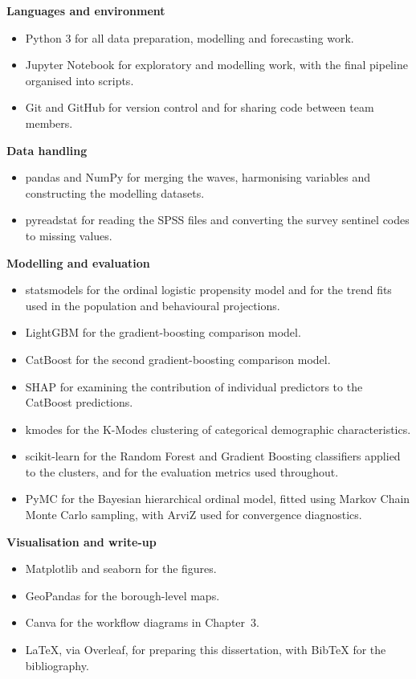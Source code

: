 \documentclass[ %
                    author={Ashrey Ashrey, Sanya Kapoor, Trisha Sharma, Yash Bhooshan Pandloskar},
                supervisor={Dr. Dalila O’Grady},
                    degree={MSc},
                     title={Using machine learning to forecast physical activity participation, volunteering and activity patterns in London},
                  subtitle={},
                      type={},
                      year={2021}]{dissertation}
\begin{document}
\noindent
\textbf{Languages and environment}
\begin{itemize}
  \item Python 3 for all data preparation, modelling and forecasting work.
  \item Jupyter Notebook for exploratory and modelling work, with the final
        pipeline organised into scripts.
  \item Git and GitHub for version control and for sharing code between team
        members.
\end{itemize}

\noindent
\textbf{Data handling}
\begin{itemize}
  \item pandas and NumPy for merging the waves, harmonising variables and
        constructing the modelling datasets.
  \item pyreadstat for reading the SPSS files and converting the survey sentinel
        codes to missing values.
\end{itemize}

\noindent
\textbf{Modelling and evaluation}
\begin{itemize}
  \item statsmodels for the ordinal logistic propensity model and for the trend
        fits used in the population and behavioural projections.
  \item LightGBM for the gradient-boosting comparison model.
  \item CatBoost for the second gradient-boosting comparison model.
  \item SHAP for examining the contribution of individual predictors to the
        CatBoost predictions.
  \item kmodes for the K-Modes clustering of categorical demographic
        characteristics.
  \item scikit-learn for the Random Forest and Gradient Boosting classifiers
        applied to the clusters, and for the evaluation metrics used throughout.
  \item PyMC for the Bayesian hierarchical ordinal model, fitted using Markov
        Chain Monte Carlo sampling, with ArviZ used for convergence diagnostics.
\end{itemize}

\noindent
\textbf{Visualisation and write-up}
\begin{itemize}
  \item Matplotlib and seaborn for the figures.
  \item GeoPandas for the borough-level maps.
  \item Canva for the workflow diagrams in Chapter~3.
  \item LaTeX, via Overleaf, for preparing this dissertation, with BibTeX for
        the bibliography.
\end{itemize}
\end{document}
